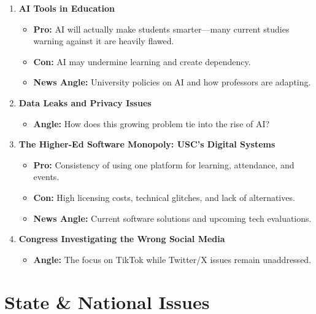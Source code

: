 \documentclass{article}
\begin{document}
\begin{enumerate}[leftmargin=*]
    \item \textbf{AI Tools in Education}
    \begin{itemize}
        \item \textbf{Pro:} AI will actually make students smarter---many current studies warning against it are heavily flawed.
        \item \textbf{Con:} AI may undermine learning and create dependency.
        \item \textbf{News Angle:} University policies on AI and how professors are adapting.
    \end{itemize}

    \item \textbf{Data Leaks and Privacy Issues}
    \begin{itemize}
        \item \textbf{Angle:} How does this growing problem tie into the rise of AI?
    \end{itemize}

    \item \textbf{The Higher-Ed Software Monopoly: USC's Digital Systems}
    \begin{itemize}
        \item \textbf{Pro:} Consistency of using one platform for learning, attendance, and events.
        \item \textbf{Con:} High licensing costs, technical glitches, and lack of alternatives.
        \item \textbf{News Angle:} Current software solutions and upcoming tech evaluations.
    \end{itemize}

    \item \textbf{Congress Investigating the Wrong Social Media}
    \begin{itemize}
        \item \textbf{Angle:} The focus on TikTok while Twitter/X issues remain unaddressed.
    \end{itemize}
\end{enumerate}

\section*{State \& National Issues}
\end{document}
